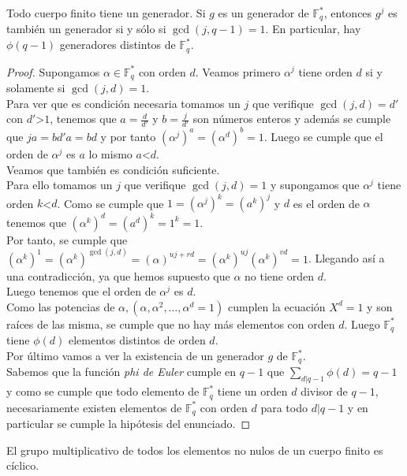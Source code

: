 \begin{teorema}
	Todo cuerpo finito tiene un generador. Si $g$ es un generador de $\mathbb{F}^{*}_q$, entonces $g^j$ es también un generador si y sólo si $\operatorname{gcd}(j,q-1)=1$. En particular, hay $\phi(q-1)$ generadores distintos de $\mathbb{F}^*_q$.
\end{teorema}
\begin{proof}
		Supongamos $\alpha \in \mathbb{F}^*_q$ con orden $d$. Veamos primero $\alpha^j$ tiene orden $d$ si y solamente si $\operatorname{gcd}(j,d)=1$.\\
		Para ver que es condición necesaria tomamos un $j$ que verifique $\operatorname{gcd}(j, d)=d'$ con $d'$\textgreater$ 1$, tenemos que $a=\frac{d}{d'}$ y $b=\frac{j}{d'}$ son números enteros y además se cumple que $ja=bd'a=bd$ y por tanto $(\alpha^j)^a=(\alpha^d)^b=1$. Luego se cumple que el orden de $\alpha^j$ es $a$ lo mismo $a$\textless $d$.\\
		Veamos que también es condición suficiente.\\ Para ello tomamos un $j$ que verifique $\operatorname{gcd}(j,d)=1$ y supongamos que $\alpha^j$ tiene orden $k$\textless $d$. Como se cumple que $1=(\alpha^j)^k=(a^k)^j$ y $d$ es el orden de $\alpha$ tenemos que $(\alpha^k)^d=(a^d)^k=1^k=1$.\\
		Por tanto, se cumple que  $(\alpha^k)^1=(\alpha^k)^{\operatorname{gcd}(j,d)}=(\alpha)^{uj+rd}=(\alpha^k)^{uj}(\alpha^k)^{vd}=1$. Llegando así a una contradicción, ya que hemos supuesto que $\alpha$ no tiene orden $d$.\\
		Luego tenemos que el orden de $\alpha^j$ es $d$.\\
		Como las potencias de $\alpha,(\alpha,\alpha^2,\dots,\alpha^d=1)$ cumplen la ecuación $X^d=1$ y son raíces de las misma, se cumple que no hay más elementos con orden $d$. Luego $\mathbb{F}^*_q$ tiene $\phi(d)$ elementos distintos de orden $d$.\\
		Por último vamos a ver la existencia de un generador $g$ de $\mathbb{F}_q^*$.\\
		Sabemos que la función \emph{phi de Euler} cumple en $q-1$ que $\sum_{d|q-1}\phi(d)=q-1$ y como se cumple que todo elemento de $\mathbb{F}^*_q$ tiene un orden $d$ divisor de $q-1$, necesariamente existen elementos de $\mathbb{F}^*_q$ con orden $d$ para todo $d|q-1$ y en particular se cumple la hipótesis del enunciado.
\end{proof}

\begin{corolario}
		El grupo multiplicativo de todos los elementos no nulos de un cuerpo finito es cíclico.
\end{corolario}

